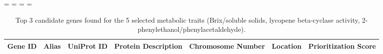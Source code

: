 \documentclass[applsci,article,accept,moreauthors,pdftex]{Definitions/mdpi}
\begin{document}
{%
\newpage
\paperwidth=\pdfpageheight
\paperheight=\pdfpagewidth
\pdfpageheight=\paperheight
\pdfpagewidth=\paperwidth
{}
\fancyheadoffset[LO,RE]{0cm}
\fancyheadoffset[RO,LE]{0cm}

\begin{table}[H]
\centering
\caption{Top 3 candidate genes found for the 5 selected metabolic traits (Brix/soluble solids, lycopene beta-cyclase activity, 2-phenylethanol/phenylacetaldehyde).}
\label{c5:tab2}
{\footnotesize
\setlength{\tabcolsep}{2pt}
\begin{tabular}{ c  c  c  c  c  c  c }
\toprule
\textbf{Gene ID} & \textbf{Alias} & \textbf{UniProt ID} & \textbf{Protein Description} & \textbf{Chromosome Number} & \textbf{Location} & \textbf{Prioritization Score} \\
\midrule


\end{tabular}}
\end{table}}
\end{document}
